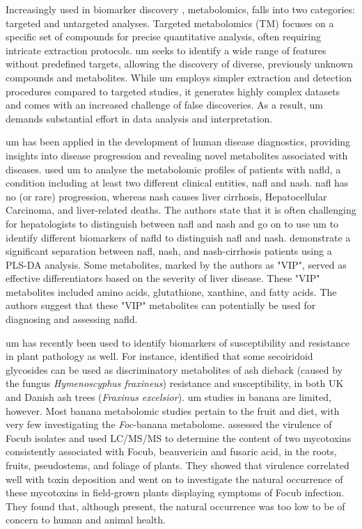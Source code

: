 Increasingly used in biomarker discovery \parencite{Li2016, Dang2018, Chen2023}, metabolomics, falls into two categories: targeted and untargeted analyses. Targeted metabolomics (TM) focuses on a specific set of compounds for precise quantitative analysis, often requiring intricate extraction protocols. \Acf{um} seeks to identify a wide range of features without predefined targets, allowing the discovery of diverse, previously unknown compounds and metabolites. While \ac{um} employs simpler extraction and detection procedures compared to targeted studies, it generates highly complex datasets and comes with an increased challenge of false discoveries. As a result, \ac{um} demands substantial effort in data analysis and interpretation.

\ac{um} has been applied in the development of human disease diagnostics, providing insights into disease progression and revealing novel metabolites associated with diseases. \textcite{Masarone2021} used \ac{um} to analyse the metabolomic profiles of patients with \ac{nafld}, a condition including at least two different clinical entities, \ac{nafl} and \ac{nash}. \ac{nafl} has no (or rare) progression, whereas \ac{nash} causes liver cirrhosis, Hepatocellular Carcinoma, and liver-related deaths. The authors state that it is often challenging for hepatologists to distinguish between \ac{nafl} and \ac{nash} and go on to use \ac{um} to identify different biomarkers of \ac{nafld} to distinguish \ac{nafl} and \ac{nash}. \textcite{Masarone2021} demonstrate a significant separation between \ac{nafl}, \ac{nash}, and \ac{nash}-cirrhosis patients using a PLS-DA analysis. Some metabolites, marked by the authors as "VIP", served as effective differentiators based on the severity of liver disease. These "VIP" metabolites included amino acids, glutathione, xanthine, and fatty acids. The authors suggest that these "VIP" metabolites can potentially be used for diagnosing and assessing \ac{nafld}.

\ac{um} has recently been used to identify biomarkers of susceptibility and resistance in plant pathology as well. For instance, \textcite{Sambles2017, Sidda2020} identified that some secoiridoid glycosides can be used as discriminatory metabolites of ash dieback  (caused by the fungus \textit{Hymenoscyphus fraxineus}) resistance and susceptibility,  in both UK and Danish ash trees (\textit{Fraxinus excelsior}). \Ac{um} studies in banana are limited, however. Most banana metabolomic studies pertain to the fruit and diet, with very few investigating the \textit{Foc}-banana metabolome. \textcite{Li2013c} assessed the virulence of \ac{Focub} isolates and used LC/MS/MS to determine the content of two mycotoxins consistently associated with \ac{Focub}, beauvericin and fusaric acid, in the roots, fruits, pseudostems, and foliage of plants. They showed that virulence correlated well with toxin deposition and went on to investigate the natural occurrence of these mycotoxins in field-grown plants displaying symptoms of \ac{Focub} infection. They found that, although present, the natural occurrence was too low to be of concern to human and animal health.

